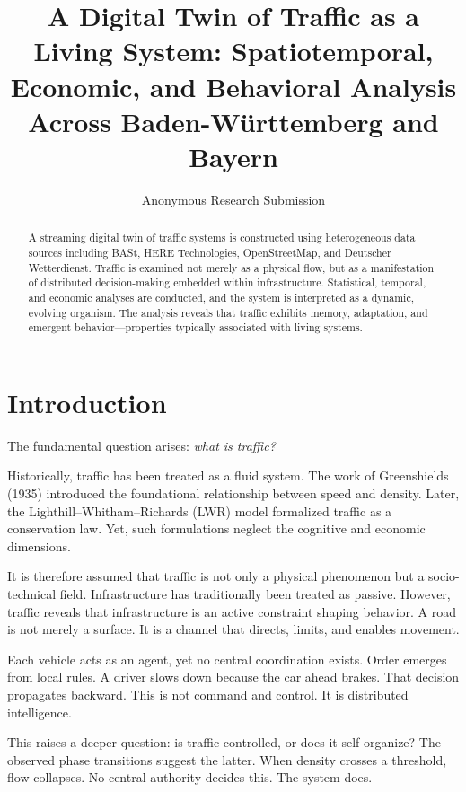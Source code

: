 \documentclass[12pt]{article}
\author{Anonymous Research Submission}
\title{A Digital Twin of Traffic as a Living System: Spatiotemporal, Economic, and Behavioral Analysis Across Baden-Württemberg and Bayern}
\author{}
\date{}
\begin{document}
\sloppy
\maketitle

\begin{abstract}
A streaming digital twin of traffic systems is constructed using heterogeneous data sources including BASt, HERE Technologies, OpenStreetMap, and Deutscher Wetterdienst. Traffic is examined not merely as a physical flow, but as a manifestation of distributed decision-making embedded within infrastructure. Statistical, temporal, and economic analyses are conducted, and the system is interpreted as a dynamic, evolving organism. The analysis reveals that traffic exhibits memory, adaptation, and emergent behavior—properties typically associated with living systems.
\end{abstract}

\section{Introduction}

The fundamental question arises: \textit{what is traffic?}

Historically, traffic has been treated as a fluid system. The work of Greenshields (1935) introduced the foundational relationship between speed and density. Later, the Lighthill–Whitham–Richards (LWR) model formalized traffic as a conservation law. Yet, such formulations neglect the cognitive and economic dimensions.

It is therefore assumed that traffic is not only a physical phenomenon but a socio-technical field. Infrastructure has traditionally been treated as passive. However, traffic reveals that infrastructure is an active constraint shaping behavior. A road is not merely a surface. It is a channel that directs, limits, and enables movement.

Each vehicle acts as an agent, yet no central coordination exists. Order emerges from local rules. A driver slows down because the car ahead brakes. That decision propagates backward. This is not command and control. It is distributed intelligence.

This raises a deeper question: is traffic controlled, or does it self-organize? The observed phase transitions suggest the latter. When density crosses a threshold, flow collapses. No central authority decides this. The system does.
\end{document}
